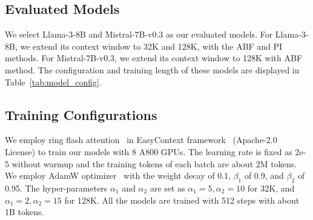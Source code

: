 \subsection{Evaluated Models}
We select Llama-3-8B and Mistral-7B-v0.3 as our evaluated models. For Llama-3-8B, we extend its context window to 32K and 128K, with the ABF and PI methods. For Mistral-7B-v0.3, we extend its context window to 128K with ABF method. The configuration and training length of these models are displayed in Table~\ref{tab:model_config}.


\begin{table}[htb]
    \centering
    \caption{Configuration of models and length of datasets. CW denotes the context window of target models, PE denotes the scaling methods of RoPE, Ratio denotes the RoPE theta for ABF methods, and the interpolation ratio for PI methods. $L_{\mathcal D_1}$, $L_{\mathcal D_2}$, and $L_{\mathcal D_3}$ denotes the length of the three datasets.}
    \label{tab:model_config}
\end{table}

\subsection{Training Configurations}
We employ ring flash attention~\cite{liu-arxiv-2023-ringattn} in EasyContext framework~\cite{zhang-arxiv-2024-easycontext} (Apache-2.0 License) to train our models with 8 A800 GPUs. The learning rate is  fixed as 2e-5 without warmup and the training tokens of each batch are about 2M tokens. We employ AdamW optimizer~\cite{Loshchilov-iclr-2019-adamw} with the weight decay of 0.1, $\beta_1$ of 0.9, and $\beta_2$ of 0.95.  The hyper-parameters $\alpha_1$ and $\alpha_2$ are set as $\alpha_1=5, \alpha_2=10$ for 32K, and $\alpha_1=2, \alpha_2=15$ for 128K. All the models are trained with 512 steps with about 1B tokens.

